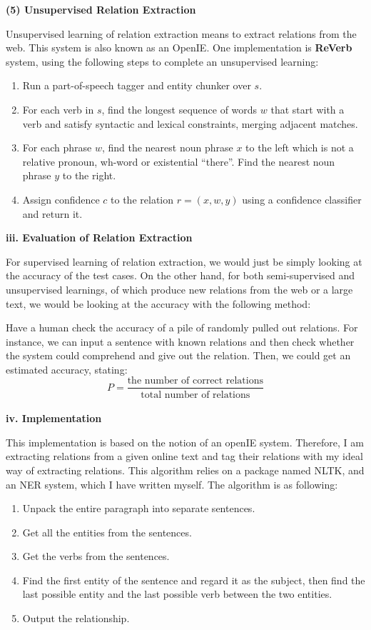 \documentclass[a4paper,12pt]{report}
\begin{document}
\noindent
\textbf{(5) Unsupervised Relation Extraction}

\noindent
Unsupervised learning of relation extraction means to extract relations from the web. This system is also known as an OpenIE. One implementation is \textbf{ReVerb} system, using the following steps to complete an unsupervised learning: 
\begin{enumerate}
\item Run a part-of-speech tagger and entity chunker over $s$.
\item For each verb in $s$, find the longest sequence of words $w$ that start with a verb and satisfy syntactic and lexical constraints, merging adjacent matches.
\item For each phrase $w$, find the nearest noun phrase $x$ to the left which is not a relative pronoun, wh-word or existential “there”. Find the nearest noun phrase $y$ to the right.
\item Assign confidence $c$ to the relation $r = (x, w , y)$ using a confidence classifier and return it.
\end{enumerate}

\noindent
\textbf{iii. Evaluation of Relation Extraction}

\noindent
For supervised learning of relation extraction, we would just be simply looking at the accuracy of the test cases. On the other hand, for both semi-supervised and unsupervised learnings, of which produce new relations from the web or a large text, we would be looking at the accuracy with the following method:

\noindent
Have a human check the accuracy of a pile of randomly pulled out relations. For instance, we can input a sentence with known relations and then check whether the system could comprehend and give out the relation. Then, we could get an estimated accuracy, stating:\[P = \frac{\text{the number of correct relations}}{\text{total number of relations}}\]\\

\noindent
\textbf{iv. Implementation}

\noindent
This implementation is based on the notion of an openIE system. Therefore, I am extracting relations from a given online text and tag their relations with my ideal way of extracting relations. This algorithm relies on a package named NLTK, and an NER system, which I have written myself. The algorithm is as following: 
\begin{enumerate}
\item Unpack the entire paragraph into separate sentences.
\item Get all the entities from the sentences.
\item Get the verbs from the sentences.
\item Find the first entity of the sentence and regard it as the subject, then find the last possible entity and the last possible verb between the two entities. 
\item Output the relationship. 
\end{enumerate}
\end{document}
